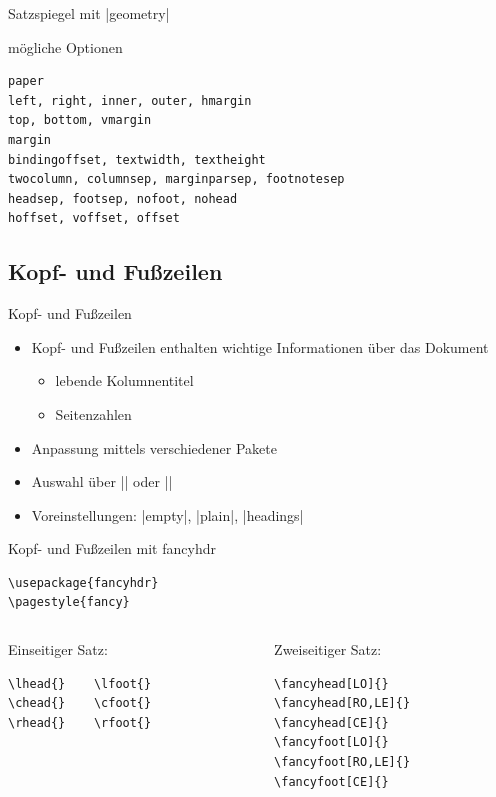 \documentclass[
	vorläufig=true,
	datum=2016-10-28,
	titel={Allgemeine Formatierung und Pakete},
	web=false,
]{../tex/latexkurs-slides}
\begin{document}
\begin{frame}[fragile,t]{Satzspiegel mit |geometry|}
	\vspace{-1.5em}
	\begin{block}{mögliche Optionen}
		\vspace{-1em}
\begin{verbatim}
paper
left, right, inner, outer, hmargin
top, bottom, vmargin
margin
bindingoffset, textwidth, textheight
twocolumn, columnsep, marginparsep, footnotesep
headsep, footsep, nofoot, nohead
hoffset, voffset, offset
\end{verbatim}
	\end{block}
\end{frame}



\subsection{Kopf- und Fußzeilen}
\begin{frame}[fragile, t]{Kopf- und Fußzeilen}
	\begin{itemize}
		\item Kopf- und Fußzeilen enthalten wichtige Informationen über das Dokument 
		\begin{itemize}
			\item lebende Kolumnentitel
			\item Seitenzahlen
		\end{itemize}
		\item Anpassung mittels verschiedener Pakete
		\item Auswahl über || oder || 
		\item Voreinstellungen: |empty|, |plain|, |headings|
	\end{itemize}
\end{frame}


\begin{frame}[fragile, t]{Kopf- und Fußzeilen mit fancyhdr}
\begin{lstlisting}
\usepackage{fancyhdr}
\pagestyle{fancy}
\end{lstlisting}
	\begin{columns}
		\begin{column}{.45\textwidth}
			\vspace{-3.87em}
			
			Einseitiger Satz:
\begin{lstlisting}
\lhead{}    \lfoot{}
\chead{}    \cfoot{}
\rhead{}    \rfoot{}
\end{lstlisting}
		\end{column}
		\begin{column}{.45\textwidth}
		Zweiseitiger Satz:
\begin{lstlisting}
\fancyhead[LO]{}
\fancyhead[RO,LE]{}
\fancyhead[CE]{}
\fancyfoot[LO]{}
\fancyfoot[RO,LE]{}
\fancyfoot[CE]{}
\end{lstlisting}
		\end{column}
	\end{columns}
\end{frame}
\end{document}
